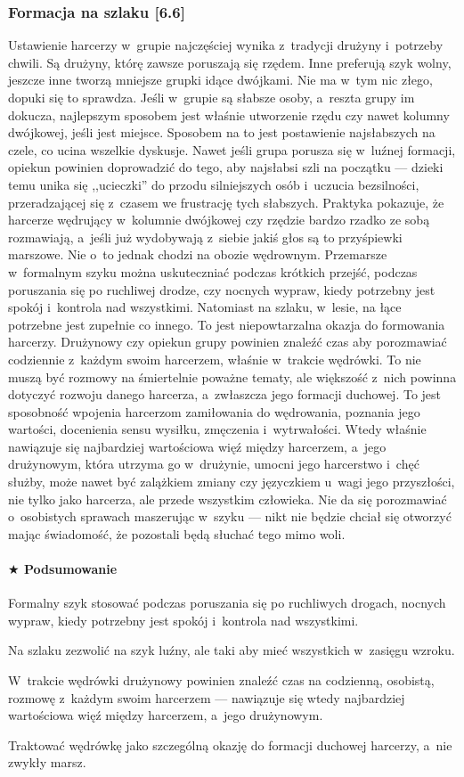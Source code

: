 \documentclass[a5paper,10pt,titlepage,twoside]{article}
\newcommand*{\thecheckbox}{\hss$\Box$} %
\newenvironment*{checklist}
{\list{}{%
\renewcommand*{\makelabel}[1]{\thecheckbox}}}
{\endlist}
\begin{document}
\subsubsection{Formacja na szlaku [6.6]}
Ustawienie harcerzy w~grupie najczęściej wynika z~tradycji drużyny i~potrzeby chwili. Są drużyny, którę zawsze poruszają się rzędem. Inne preferują szyk wolny, jeszcze inne tworzą mniejsze grupki idące dwójkami. Nie ma w~tym nic złego, dopuki się to sprawdza. Jeśli w~grupie są słabsze osoby, a~reszta grupy im dokucza, najlepszym sposobem jest właśnie utworzenie rzędu czy nawet kolumny dwójkowej, jeśli jest miejsce. Sposobem na to jest postawienie najsłabszych na czele, co ucina wszelkie dyskusje. Nawet jeśli grupa porusza się w~luźnej formacji, opiekun powinien doprowadzić do tego, aby najsłabsi szli na początku --- dzieki temu unika się ,,ucieczki'' do przodu silniejszych osób i~uczucia bezsilności, przeradzającej się z~czasem we frustrację tych słabszych. Praktyka pokazuje, że harcerze wędrujący w~kolumnie dwójkowej czy rzędzie bardzo rzadko ze sobą rozmawiają, a~jeśli już wydobywają z~siebie jakiś głos są to przyśpiewki marszowe. Nie o~to jednak chodzi na obozie wędrownym. Przemarsze w~formalnym szyku można uskuteczniać podczas krótkich przejść, podczas poruszania się po ruchliwej drodze, czy nocnych wypraw, kiedy potrzebny jest spokój i~kontrola nad wszystkimi. Natomiast na szlaku, w~lesie, na łące potrzebne jest zupełnie co innego. To jest niepowtarzalna okazja do formowania harcerzy. Drużynowy czy opiekun grupy powinien znaleźć czas aby porozmawiać codziennie z~każdym swoim harcerzem, właśnie w~trakcie wędrówki. To nie muszą być rozmowy na śmiertelnie poważne tematy, ale większość z~nich powinna dotyczyć rozwoju danego harcerza, a~zwłaszcza jego formacji duchowej. To jest sposobność wpojenia harcerzom zamiłowania do wędrowania, poznania jego wartości, docenienia sensu wysiłku, zmęczenia i~wytrwałości. Wtedy właśnie nawiązuje się najbardziej wartościowa więź między harcerzem, a~jego drużynowym, która utrzyma go w~drużynie, umocni jego harcerstwo i~chęć służby, może nawet być zalążkiem zmiany czy języczkiem u~wagi jego przyszłości, nie tylko jako harcerza, ale przede wszystkim człowieka. Nie da się porozmawiać o~osobistych sprawach maszerując w~szyku --- nikt nie będzie chciał się otworzyć mając świadomość, że pozostali będą słuchać tego mimo woli.
\paragraph{$\bigstar$ Podsumowanie}
\begin{checklist}
\item Formalny szyk stosować podczas poruszania się po ruchliwych drogach, nocnych wypraw, kiedy potrzebny jest spokój i~kontrola nad wszystkimi.
\item Na szlaku zezwolić na szyk luźny, ale taki aby mieć wszystkich w~zasięgu wzroku.
\item W~trakcie wędrówki drużynowy powinien znaleźć czas na codzienną, osobistą, rozmowę z~każdym swoim harcerzem --- nawiązuje się wtedy najbardziej wartościowa więź między harcerzem, a~jego drużynowym.
\item Traktować wędrówkę jako szczególną okazję do formacji duchowej harcerzy, a~nie zwykły marsz.
\end{checklist}
\end{document}

